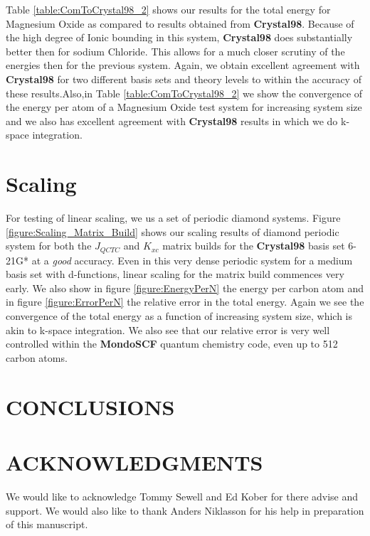 \documentclass[prb,aps,nobibnotes,twocolumn,doublespace,twocolumngrid,superbib]{revtex4}
\begin{document}
Table \ref{table:ComToCrystal98_2} shows our results for the total
energy for Magnesium Oxide as compared to results obtained from \textbf{Crystal98}.
Because of the high degree of Ionic bounding in this system, \textbf{Crystal98}
does substantially better then for sodium Chloride. This allows for
a much closer scrutiny of the energies then for the previous system.
Again, we obtain excellent agreement with \textbf{Crystal98} for two
different basis sets and theory levels to within the accuracy of these
results.Also,in Table \ref{table:ComToCrystal98_2}
we show the convergence of the energy per atom of a Magnesium Oxide
test system for increasing system size and we also has excellent agreement
with \textbf{Crystal98} results in which we do k-space integration.



\section{Scaling}

For testing of linear scaling, we us a set of periodic diamond systems.
Figure \ref{figure:Scaling_Matrix_Build} shows our scaling results
of diamond periodic system for both the \( J_{QCTC} \) and \( K_{xc} \)
matrix builds for the \textbf{Crystal98} basis set 6-21G* \cite{C98Basis}
at a {\it good} accuracy. Even in this very dense periodic system for a medium 
basis set with d-functions, linear scaling for the matrix build commences very 
early. We also show in figure \ref{figure:EnergyPerN} the energy per carbon atom and 
in figure \ref{figure:ErrorPerN} the relative error in the total energy. 
Again we see the convergence of the total energy
as a function of increasing system size, which is akin to k-space integration. We also
see that our relative error is very well controlled within the \textbf{MondoSCF} quantum
chemistry code, even up to 512 carbon atoms.


\section{CONCLUSIONS}


\section*{ACKNOWLEDGMENTS}

We would like to acknowledge Tommy Sewell and Ed Kober for there advise
and support. We would also like to thank Anders Niklasson for his help
in preparation of this manuscript. 
\end{document}
